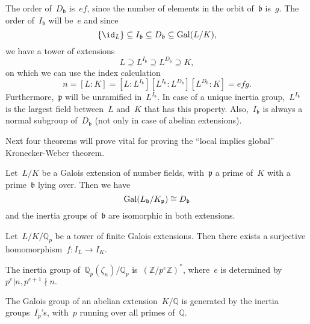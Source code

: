 The order of~$D_\mathfrak{b}$ is~$ef$, since the number of elements in the orbit of~$\mathfrak{b}$ is~$g$. The order of~$I_\mathfrak{b}$ will be~$e$ and since 
\begin{equation}
  \{\id_L\}\subseteq I_\mathfrak{b} \subseteq D_\mathfrak{b} \subseteq \Gal(L/K),
\end{equation}
we have a tower of extensions
\begin{equation}
  L\supseteq L^{I_\mathfrak{b}} \supseteq L^{D_\mathfrak{b}} \supseteq K, 
\end{equation}
on which we can use the index calculation
\begin{equation}
  n = \left[L:K\right] = \left[L:L^{I_\mathfrak{b}}\right]\left[L^{I_\mathfrak{b}}:L^{D_\mathfrak{b}}\right]\left[L^{D_\mathfrak{b}}:K\right]=efg. 
\end{equation}
Furthermore,~$\mathfrak{p}$ will be unramified in~$L^{I_\mathfrak{b}}$. In case of a unique inertia group,~$L^{I_\mathfrak{b}}$ is the largest field between~$L$ and~$K$ that has this property. Also,~$I_\mathfrak{b}$ is always a normal subgroup of~$D_\mathfrak{b}$ (not only in case of abelian extensions).

Next four theorems will prove vital for proving the ``local implies global'' Kronecker-Weber theorem.

\begin{theorem}
  Let~$L/K$ be a Galois extension of number fields, with~$\mathfrak{p}$ a prime of~$K$ with a prime~$\mathfrak{b}$ lying over. Then we have
  \begin{equation}
    \operatorname{Gal}(L_\mathfrak{b}/K_\mathfrak{p}) \cong D_\mathfrak{b} 
  \end{equation}
  and the inertia groups of~$\mathfrak{b}$ are isomorphic in both extensions.
\end{theorem}

\begin{theorem}
  Let~$L/K/\mathbb{Q}_p$ be a tower of finite Galois extensions. Then there exists a surjective homomorphism~$f\colon I_L \rightarrow I_K$.
\end{theorem}

\begin{theorem}
  The inertia group of~$\mathbb{Q}_p(\zeta_n)/\mathbb{Q}_p$ is~$(\mathbb{Z}/p^e\mathbb{Z})^*$, where~$e$ is determined by~$p^e|n, p^{e+1} \nmid n.$
\end{theorem}

\begin{theorem}
  The Galois group of an abelian extension~$K/\mathbb{Q}$ is generated by the inertia groups~$I_{p}$'s, with~$p$ running over all primes of~$\mathbb{Q}$.
\end{theorem}

